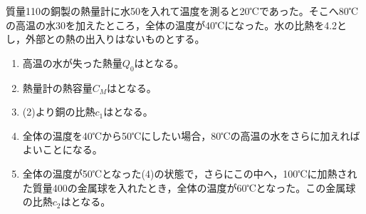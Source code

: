 \hakosyokika
\item 質量110の銅製の熱量計に水50を入れて温度を測ると20℃であった。そこへ80℃の高温の水30を加えたところ，全体の温度が40℃になった。水の比熱を4.2とし，外部との熱の出入りはないものとする。
\begin{enumerate}
    \item 高温の水が失った熱量$Q_0$は\Hako {}となる。
    \item 熱量計の熱容量$C_M$は\Hako {}となる。
    \item (2)より銅の比熱$c_1$は\Hako {}となる。
    \item 全体の温度を40℃から50℃にしたい場合，80℃の高温の水をさらに\Hako {}加えればよいことになる。
    \item 全体の温度が50℃となった(4)の状態で，さらにこの中へ，100℃に加熱された質量400の金属球を入れたとき，全体の温度が60℃となった。この金属球の比熱$c_2$は\Hako {}となる。
\end{enumerate}